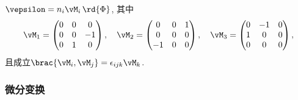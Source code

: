\documentclass[../TheoreticalMechanics.tex]{subfiles}
\begin{document}
\begin{lemma}[旋转生成元]
    \label{lem:旋转生成元}
    $\vepsilon = n_i\vM_i\,\rd{\Phi}$, 其中
    \[ \vM_1 = \begin{pmatrix}
        0 & 0 & 0 \\
        0 & 0 & -1 \\
        0 & 1 & 0
    \end{pmatrix},\quad \vM_2 = \begin{pmatrix}
        0 & 0 & 1 \\
        0 & 0 & 0 \\
        -1 & 0 & 0
    \end{pmatrix},\quad \vM_3 = \begin{pmatrix}
        0 & -1 & 0 \\
        1 & 0 & 0 \\
        0 & 0 & 0
    \end{pmatrix}, \]
    且成立$\brac{\vM_i,\vM_j} = \epsilon_{ijk}\vM_k$.
\end{lemma}


\subsubsection{微分变换} %
\label{ssub:微分变换}
\end{document}

